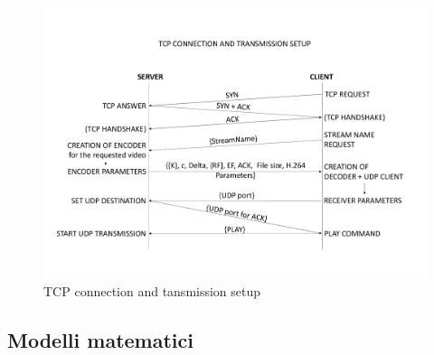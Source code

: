 \documentclass[italian, a4paper, 12pt]{article}
\begin{document}
\begin{figure}[H]
    \centering
        \includegraphics[clip, trim=0cm 1cm 0cm 1cm, width=1.00\textwidth]{TCP.pdf}
    \caption{TCP connection and tansmission setup}
    \label{fig:TCP}
\end{figure}
%
\newpage
\subsection{Modelli matematici}
\end{document}
